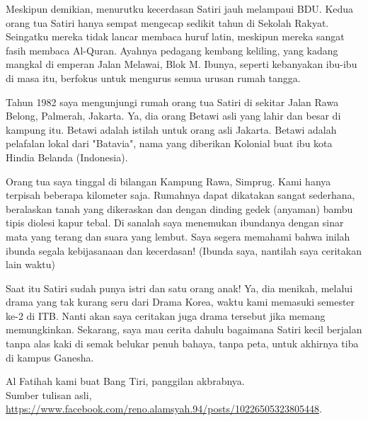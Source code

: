 Meskipun demikian, menurutku kecerdasan Satiri jauh melampaui BDU. Kedua orang tua Satiri hanya sempat mengecap sedikit tahun di Sekolah Rakyat. Seingatku mereka tidak lancar membaca huruf latin, meskipun mereka sangat fasih membaca Al-Quran. Ayahnya pedagang kembang keliling, yang kadang mangkal di emperan Jalan Melawai, Blok M. Ibunya, seperti kebanyakan ibu-ibu di masa itu, berfokus untuk mengurus semua urusan rumah tangga.

Tahun 1982 saya mengunjungi rumah orang tua Satiri di sekitar Jalan Rawa Belong, Palmerah, Jakarta. Ya, dia orang Betawi asli yang lahir dan besar di kampung itu. Betawi adalah istilah untuk orang asli Jakarta. Betawi adalah pelafalan lokal dari "Batavia", nama yang diberikan Kolonial buat ibu kota Hindia Belanda (Indonesia).

Orang tua saya tinggal di bilangan Kampung Rawa, Simprug. Kami hanya terpisah beberapa kilometer saja. Rumahnya dapat dikatakan sangat sederhana, beralaskan tanah yang dikeraskan dan dengan dinding gedek (anyaman) bambu tipis diolesi kapur tebal. Di sanalah saya menemukan ibundanya dengan sinar mata yang terang dan suara yang lembut. Saya segera memahami bahwa inilah ibunda segala kebijasanaan dan kecerdasan! (Ibunda saya, nantilah saya ceritakan lain waktu)

Saat itu Satiri sudah punya istri dan satu orang anak! Ya, dia menikah, melalui drama yang tak kurang seru dari Drama Korea, waktu kami memasuki semester ke-2 di ITB. Nanti akan saya ceritakan juga drama tersebut jika memang memungkinkan. Sekarang, saya mau cerita dahulu bagaimana Satiri kecil berjalan tanpa alas kaki di semak belukar penuh bahaya, tanpa peta, untuk akhirnya tiba di kampus Ganesha.

Al Fatihah kami buat Bang Tiri, panggilan akbrabnya.
\\[10pt]
Sumber tulisan asli, \url{https://www.facebook.com/reno.alamsyah.94/posts/10226505323805448}.

